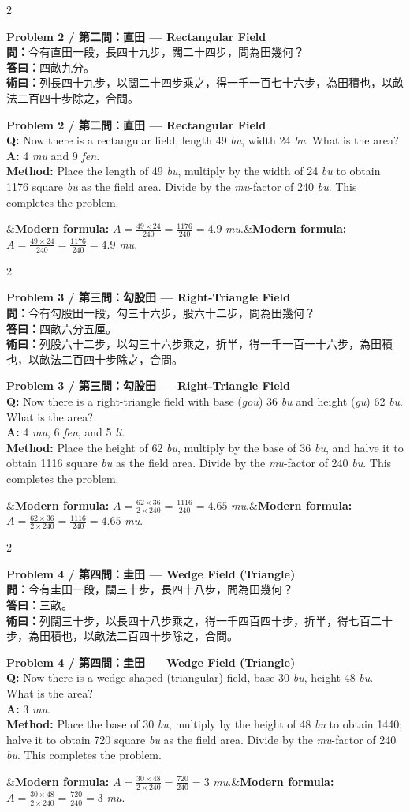 \documentclass[11pt,a4paper]{article}
\newcommand{\bilingualproblem}[4]{%
  \begin{paracol}{2}
  \begin{leftcolumn}
  \noindent\textbf{\color{problemcolor}#1}\\[0.2cm]
  #2
  \end{leftcolumn}
  \switchcolumn
  \noindent\textbf{\color{problemcolor}#1}\\[0.2cm]
  #3
  \end{paracol}
  \ifx&#4&\else\vspace{0.3cm}\noindent#4\fi
  \vspace{0.5cm}
}
\newcommand{\wen}[1]{\textcolor{problemcolor}{\textbf{問：}}#1}
\newcommand{\da}[1]{\textcolor{answercolor}{\textbf{答曰：}}#1}
\newcommand{\shu}[1]{\textcolor{methodcolor}{\textbf{術曰：}}#1}
\newcommand{\wenen}[1]{\textcolor{problemcolor}{\textbf{Q:}} #1}
\newcommand{\daen}[1]{\textcolor{answercolor}{\textbf{A:}} #1}
\newcommand{\shuen}[1]{\textcolor{methodcolor}{\textbf{Method:}} #1}
\begin{document}
\bilingualproblem{Problem 2 / 第二問：直田 --- Rectangular Field}{
\wen{今有直田一段，長四十九步，闊二十四步，問為田幾何？}\\[0.2cm]
\da{四畝九分。}\\[0.2cm]
\shu{列長四十九步，以闊二十四步乘之，得一千一百七十六步，為田積也，以畝法二百四十步除之，合問。}
}{
\wenen{Now there is a rectangular field, length 49 \textit{bu}, width 24 \textit{bu}. What is the area?}\\[0.2cm]
\daen{4 \textit{mu} and 9 \textit{fen}.}\\[0.2cm]
\shuen{Place the length of 49 \textit{bu}, multiply by the width of 24 \textit{bu} to obtain 1176 square \textit{bu} as the field area. Divide by the \textit{mu}-factor of 240 \textit{bu}. This completes the problem.}
}{\textbf{Modern formula:} $A = \frac{49 \times 24}{240} = \frac{1176}{240} = 4.9$ \textit{mu}.}

\bilingualproblem{Problem 3 / 第三問：勾股田 --- Right-Triangle Field}{
\wen{今有勾股田一段，勾三十六步，股六十二步，問為田幾何？}\\[0.2cm]
\da{四畝六分五厘。}\\[0.2cm]
\shu{列股六十二步，以勾三十六步乘之，折半，得一千一百一十六步，為田積也，以畝法二百四十步除之，合問。}
}{
\wenen{Now there is a right-triangle field with base (\textit{gou}) 36 \textit{bu} and height (\textit{gu}) 62 \textit{bu}. What is the area?}\\[0.2cm]
\daen{4 \textit{mu}, 6 \textit{fen}, and 5 \textit{li}.}\\[0.2cm]
\shuen{Place the height of 62 \textit{bu}, multiply by the base of 36 \textit{bu}, and halve it to obtain 1116 square \textit{bu} as the field area. Divide by the \textit{mu}-factor of 240 \textit{bu}. This completes the problem.}
}{\textbf{Modern formula:} $A = \frac{62 \times 36}{2 \times 240} = \frac{1116}{240} = 4.65$ \textit{mu}.}

\bilingualproblem{Problem 4 / 第四問：圭田 --- Wedge Field (Triangle)}{
\wen{今有圭田一段，闊三十步，長四十八步，問為田幾何？}\\[0.2cm]
\da{三畝。}\\[0.2cm]
\shu{列闊三十步，以長四十八步乘之，得一千四百四十步，折半，得七百二十步，為田積也，以畝法二百四十步除之，合問。}
}{
\wenen{Now there is a wedge-shaped (triangular) field, base 30 \textit{bu}, height 48 \textit{bu}. What is the area?}\\[0.2cm]
\daen{3 \textit{mu}.}\\[0.2cm]
\shuen{Place the base of 30 \textit{bu}, multiply by the height of 48 \textit{bu} to obtain 1440; halve it to obtain 720 square \textit{bu} as the field area. Divide by the \textit{mu}-factor of 240 \textit{bu}. This completes the problem.}
}{\textbf{Modern formula:} $A = \frac{30 \times 48}{2 \times 240} = \frac{720}{240} = 3$ \textit{mu}.}
\end{document}
